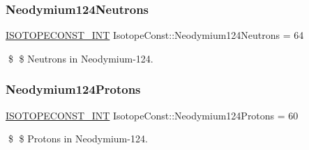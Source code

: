 \subsubsection{\texorpdfstring{Neodymium124\+Neutrons}{Neodymium124Neutrons}}
{\footnotesize\ttfamily \mbox{\hyperlink{group___isotope_const-_macros_ga5f18360b3e99483a35c32d789e62621c}{I\+S\+O\+T\+O\+P\+E\+C\+O\+N\+S\+T\+\_\+\+I\+NT}} Isotope\+Const\+::\+Neodymium124\+Neutrons = 64}

\$ \$ Neutrons in Neodymium-\/124. \mbox{\label{group___isotope_const-_neodymium-_nd124_ga713ebe4128993eec0d239682328cd65b}} 
\subsubsection{\texorpdfstring{Neodymium124\+Protons}{Neodymium124Protons}}
{\footnotesize\ttfamily \mbox{\hyperlink{group___isotope_const-_macros_ga5f18360b3e99483a35c32d789e62621c}{I\+S\+O\+T\+O\+P\+E\+C\+O\+N\+S\+T\+\_\+\+I\+NT}} Isotope\+Const\+::\+Neodymium124\+Protons = 60}

\$ \$ Protons in Neodymium-\/124. 